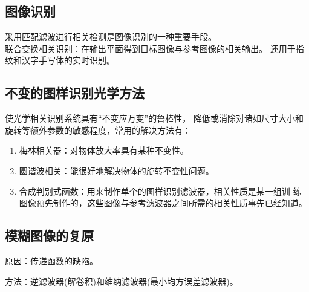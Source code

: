\documentclass[twocolumn]{ctexart}
\begin{document}
\subsection{图像识别}
采用匹配滤波进行相关检测是图像识别的一种重要手段。\\
联合变换相关识别：在输出平面得到目标图像与参考图像的相关输出。
还用于指纹和汉字手写体的实时识别。

\subsection{不变的图样识别光学方法}
使光学相关识别系统具有“不变应万变”的鲁棒性，
降低或消除对诸如尺寸大小和旋转等额外参数的敏感程度，常用的解决方法有：
\begin{enumerate}
    \item 梅林相关器：对物体放大率具有某种不变性。
    \item 圆谐波相关：能很好地解决物体的旋转不变性问题。
    \item 合成判别式函数：用来制作单个的图样识别滤波器，相关性质是某一组训
    练图像预先制作的，这些图像与参考滤波器之间所需的相关性质事先已经知道。
\end{enumerate}

\subsection{模糊图像的复原}
原因：传递函数的缺陷。\par
方法：逆滤波器(解卷积)和维纳滤波器(最小均方误差滤波器)。
\end{document}
